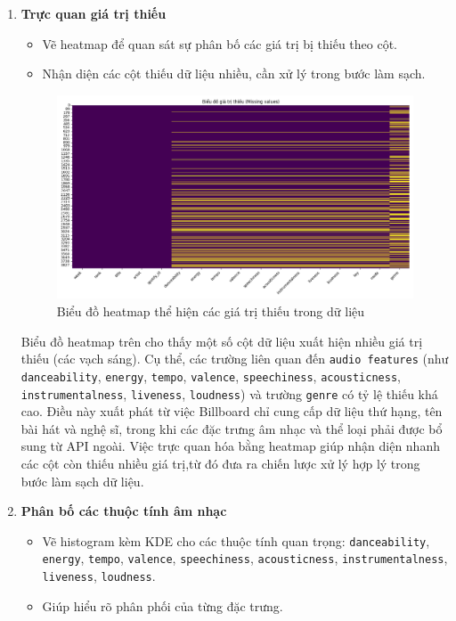 \begin{enumerate}[label=\arabic*]
\begin{longtable}
        \caption{Bảng mô tả dữ liệu }
        \label{tab:data_dictionary}
        \end{longtable}
    

    \item \textbf{Trực quan giá trị thiếu}
     \begin{itemize}
        \item Vẽ heatmap để quan sát sự phân bố các giá trị bị thiếu theo cột.
        \item Nhận diện các cột thiếu dữ liệu nhiều, cần xử lý trong bước làm sạch.
    \end{itemize}
    
    \begin{figure}[H] %
        \centering
        \includegraphics[width=1.0\textwidth]{../graphics/data3/Output/step1/missing_values.png}
        \caption{Biểu đồ heatmap thể hiện các giá trị thiếu trong dữ liệu}
        \label{fig:missing}
    \end{figure}
    Biểu đồ heatmap trên cho thấy một số cột dữ liệu xuất hiện nhiều giá trị thiếu (các vạch sáng). Cụ thể, các trường liên quan đến \texttt{audio features} (như \texttt{danceability}, \texttt{energy}, \texttt{tempo}, \texttt{valence}, \texttt{speechiness}, \texttt{acousticness}, \texttt{instrumentalness}, \texttt{liveness}, \texttt{loudness}) và trường \texttt{genre} có tỷ lệ thiếu khá cao. Điều này xuất phát từ việc Billboard chỉ cung cấp dữ liệu thứ hạng, tên bài hát và nghệ sĩ, trong khi các đặc trưng âm nhạc và thể loại phải được bổ sung từ API ngoài.  Việc trực quan hóa bằng heatmap giúp nhận diện nhanh các cột còn thiếu nhiều giá trị,từ đó đưa ra chiến lược xử lý hợp lý trong bước làm sạch dữ liệu.

    \item \textbf{Phân bố các thuộc tính âm nhạc}
    \begin{itemize}
        \item Vẽ histogram kèm KDE cho các thuộc tính quan trọng: \texttt{danceability}, \texttt{energy}, \texttt{tempo}, \texttt{valence}, 
        \texttt{speechiness}, \texttt{acousticness}, \texttt{instrumentalness}, \texttt{liveness}, \texttt{loudness}.
        \item Giúp hiểu rõ phân phối của từng đặc trưng.
        

\end{itemize}
\end{enumerate}
